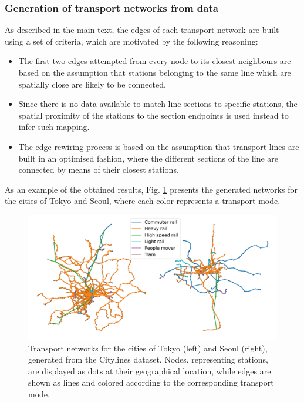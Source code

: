\subsubsection*{Generation of transport networks from data}

As described in the main text, the edges of each transport network are built using a set of criteria, which are motivated by the following reasoning:
\begin{itemize}
	\item The first two edges attempted from every node to its closest neighbours are based on the assumption that stations belonging to the same line which are spatially close are likely to be connected.
	\item Since there is no data available to match line sections to specific stations, the spatial proximity of the stations to the section endpoints is used instead to infer such mapping. 
	\item The edge rewiring process is based on the assumption that transport lines are built in an optimised fashion, where the different sections of the line are connected by means of their closest stations.
\end{itemize}
As an example of the obtained results, Fig. \ref{fig:tokyo_seul_networks} presents the generated networks for the cities of Tokyo and Seoul, where each color represents a transport mode. 

\begin{figure}[!h]
	\begin{center}
	\includegraphics[scale=0.6]{./images/task_41/tokyo_seul_networks.png} 
	\end{center}
	\caption{Transport networks for the cities of Tokyo (left) and Seoul (right), generated from the Citylines dataset. Nodes, representing stations, are displayed as dots at their geographical location, while edges are shown as lines and colored according to the corresponding transport mode.\\} 
	\label{fig:tokyo_seul_networks} 
\end{figure}

